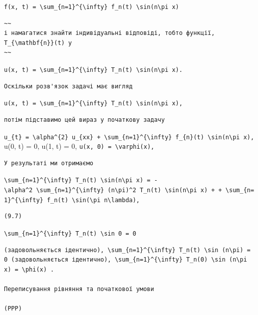 \documentclass[
  ukrainian,
]{article}
\begin{document}
\texttt{f(x,\ t)\ =\ \textbackslash{}sum\_\{n=1\}\^{}\{\textbackslash{}infty\}\ f\_n(t)\ \textbackslash{}sin(n\textbackslash{}pi\ x)}

\begin{verbatim}
~~
і намагатися знайти індивідуальні відповіді, тобто функції, T_{\mathbf{n}}(t) у
~~
\end{verbatim}

\texttt{u(x,\ t)\ =\ \textbackslash{}sum\_\{n=1\}\^{}\{\textbackslash{}infty\}\ T\_n(t)\ \textbackslash{}sin(n\textbackslash{}pi\ x).}

\begin{verbatim}
Оскільки розв'язок задачі має вигляд
\end{verbatim}

\texttt{u(x,\ t)\ =\ \textbackslash{}sum\_\{n=1\}\^{}\{\textbackslash{}infty\}\ T\_n(t)\ \textbackslash{}sin(n\textbackslash{}pi\ x),}

\begin{verbatim}
потім підставимо цей вираз у початкову задачу
\end{verbatim}

\texttt{u\_\{t\}\ =\ \textbackslash{}alpha\^{}\{2\}\ u\_\{xx\}\ +\ \textbackslash{}sum\_\{n=1\}\^{}\{\textbackslash{}infty\}\ f\_\{n\}(t)\ \textbackslash{}sin(n\textbackslash{}pi\ x),}
u(0, t) = 0, u(1, t) = 0,
\texttt{u(x,\ 0)\ =\ \textbackslash{}varphi(x),}

\begin{verbatim}
У результаті ми отримаємо
\end{verbatim}

\texttt{\textbackslash{}sum\_\{n=1\}\^{}\{\textbackslash{}infty\}\ T\textquotesingle{}\_n(t)\ \textbackslash{}sin(n\textbackslash{}pi\ x)\ =\ -\textbackslash{}alpha\^{}2\ \textbackslash{}sum\_\{n=1\}\^{}\{\textbackslash{}infty\}\ (n\textbackslash{}pi)\^{}2\ T\_n(t)\ \textbackslash{}sin(n\textbackslash{}pi\ x)\ +\ +\ \textbackslash{}sum\_\{n=1\}\^{}\{\textbackslash{}infty\}\ f\_n(t)\ \textbackslash{}sin(\textbackslash{}pi\ n\textbackslash{}lambda),}

\begin{verbatim}
(9.7)
\end{verbatim}

\texttt{\textbackslash{}sum\_\{n=1\}\^{}\{\textbackslash{}infty\}\ T\_n(t)\ \textbackslash{}sin\ 0\ =\ 0}

\begin{verbatim}
(задовольняється ідентично), \sum_{n=1}^{\infty} T_n(t) \sin (n\pi) = 0 (задовольняється ідентично), \sum_{n=1}^{\infty} T_n(0) \sin (n\pi x) = \phi(x) .

Переписування рівняння та початкової умови

(PPP)
\end{verbatim}
\end{document}
